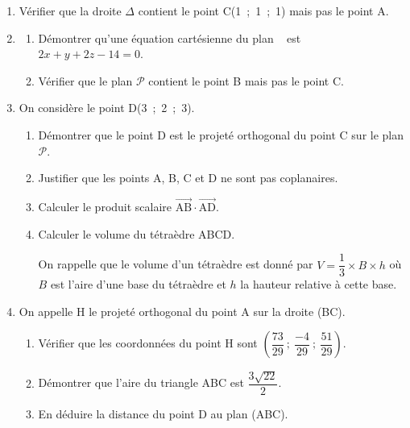 \documentclass[10pt]{article}
\providecommand{\vect}[1]{\overrightarrow{#1}}
\begin{document}
\begin{enumerate}
\item Vérifier que la droite $\Delta$ contient le point C(1~;~1~;~1) mais pas le point A.
\item
	\begin{enumerate}
		\item Démontrer qu'une équation cartésienne du plan ~ est $2x + y + 2z - 14 = 0$.
		\item Vérifier que le plan $\mathcal{P}$ contient le point B mais pas le point C.
	\end{enumerate}
\item On considère le point D(3~;~2~;~3).
	\begin{enumerate}
		\item Démontrer que le point D est le projeté orthogonal du point C sur le plan $\mathcal{P}$.
		\item Justifier que les points A, B, C et D ne sont pas coplanaires.
		\item Calculer le produit scalaire $\vect{\text{AB}} \cdot \vect{\text{AD}}$.
		\item Calculer le volume du tétraèdre ABCD.
		
On rappelle que le volume d'un tétraèdre est donné par $V = \dfrac13 \times B \times h$ où $B$ est l'aire d'une base du tétraèdre et $h$ la hauteur relative à cette base.

	\end{enumerate}
\item On appelle H le projeté orthogonal du point A sur la droite (BC).
	\begin{enumerate}
		\item Vérifier que les coordonnées du point H sont $\left(\dfrac{73}{29}~;~\dfrac{-4}{29}~;~\dfrac{51}{29}\right)$.
		\item Démontrer que l'aire du triangle ABC est $\dfrac{3\sqrt{22}}{2}$.
		\item En déduire la distance du point D au plan (ABC).
	\end{enumerate}
\end{enumerate}

\medskip
\end{document}
